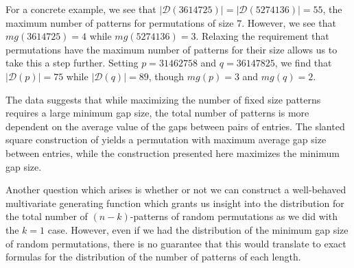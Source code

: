 \documentclass[11pt]{article}
\theoremstyle{plain}
\theoremstyle{definition}
\begin{document}
  For a concrete example, we see that $|\mathcal{D}(3614725)| =
  |\mathcal{D}(5274136)| = 55$, the maximum number of patterns for permutations
  of size $7$. However, we see that $mg(3614725) = 4$ while $mg(5274136)
  = 3$. Relaxing the requirement that permutations have the maximum number of
  patterns for their size allows us to take this a step further. Setting $p =
  31462758$ and $q = 36147825$, we find that $|\mathcal{D}(p)| = 75$ while
  $|\mathcal{D}(q)| = 89$, though $mg(p) = 3$ and $mg(q)=2$. 

  The data suggests that while maximizing the number of fixed
  size patterns requires a large minimum gap size, the total number of patterns is
  more dependent on the average value of the gaps between pairs of entries. 
  The slanted square construction of \cite{albert} yields a
  permutation with maximum average gap size between entries, while the
  construction presented here maximizes the minimum gap size.

  Another question which arises is whether or not we can construct a well-behaved
  multivariate generating function which grants us insight into the distribution
  for the total number of $(n-k)$-patterns of random permutations as we did
  with the $k=1$ case. However, even if we had the distribution of the minimum gap
  size of random permutations, there is no guarantee that this would translate to
  exact formulas for the distribution of the number of patterns of each length. 





% 
% 
\end{document}
